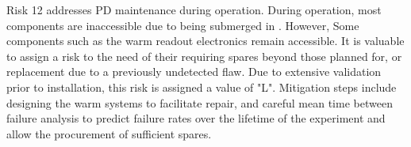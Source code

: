 Risk 12 addresses PD maintenance during operation.   During operation, most  components are inaccessible due to being submerged in .  However, Some components such as the warm readout electronics remain accessible. It is valuable to assign a risk to the need of their requiring spares beyond those planned for, or replacement due to a previously undetected flaw.  Due to extensive validation prior to installation, this risk is assigned a value of "L".  Mitigation steps include designing the warm systems to facilitate repair, and careful mean time between failure analysis to predict failure rates over the lifetime of the experiment and allow the procurement of sufficient spares.